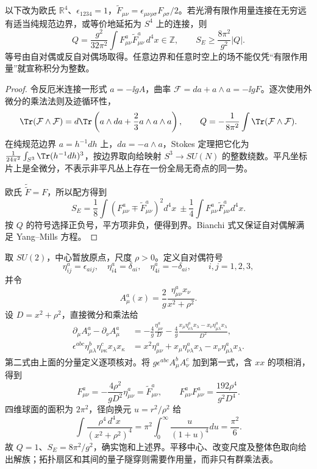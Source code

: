\begin{theorem}[欧氏拓扑荷与自对偶作用量界]
以下改为欧氏 $\mathbb R^4$、$\epsilon_{1234}=1$，$\widetilde F_{\mu\nu}=\epsilon_{\mu\nu\rho\sigma}F_{\rho\sigma}/2$。若光滑有限作用量连接在无穷远有适当纯规范边界，或等价地延拓为 $S^4$ 上的连接，则
\begin{equation}
 Q=\frac{g^2}{32\pi^2}\int F^a_{\mu\nu}\widetilde F^a_{\mu\nu}\,d^4x\in\mathbb Z,
 \qquad S_E\ge\frac{8\pi^2}{g^2}|Q|.
 \label{eq:instanton-charge}
\end{equation}
等号由自对偶或反自对偶场取得。任意边界和任意时空上的场不能仅凭“有限作用量”就宣称积分为整数。
\end{theorem}
\begin{proof}
令反厄米连接一形式 $a=-\ii gA$，曲率 $\mathcal F=da+a\wedge a=-\ii gF$。逐次使用外微分的乘法法则及迹循环性，
\[
 \Tr(\mathcal F\wedge\mathcal F)
 =d\Tr\left(a\wedge da+\frac23a\wedge a\wedge a\right),\qquad
 Q=-\frac1{8\pi^2}\int\Tr(\mathcal F\wedge\mathcal F).
\]
在纯规范边界 $a=h^{-1}dh$ 上，$da=-a\wedge a$，Stokes 定理把它化为 $\tfrac1{24\pi^2}\int_{S^3}\Tr(h^{-1}dh)^3$，按边界取向给映射 $S^3\to SU(N)$ 的整数绕数。平凡坐标片上是全微分，不表示非平凡丛上存在一份全局无奇点的同一势。

欧氏 $\widetilde{\widetilde F}=F$，所以配方得到
\[
 S_E=\frac18\int(F^a_{\mu\nu}\mp\widetilde F^a_{\mu\nu})^2d^4x
 \ \pm\frac14\int F^a_{\mu\nu}\widetilde F^a_{\mu\nu}d^4x.
\]
按 $Q$ 的符号选择正负号，平方项非负，便得到界。Bianchi 式又保证自对偶解满足 Yang--Mills 方程。
\end{proof}

\begin{workedexample}
取 $SU(2)$，中心暂放原点，尺度 $\rho>0$。定义自对偶符号
\[
 \eta^a_{ij}=\epsilon_{aij},\quad \eta^a_{i4}=\delta_{ai},\quad
 \eta^a_{4i}=-\delta_{ai},\qquad i,j=1,2,3,
\]
并令
\begin{equation}
 A_\mu^a(x)=\frac2g\frac{\eta^a_{\mu\nu}x_\nu}{x^2+\rho^2}.
 \label{eq:bpst-instanton}
\end{equation}
设 $D=x^2+\rho^2$，直接微分和乘法给
\begin{align*}
 \partial_\mu A_\nu^a-\partial_\nu A_\mu^a
 &=-\frac4g\frac{\eta^a_{\mu\nu}}D
 -\frac4g\frac{x_\mu\eta^a_{\nu\lambda}x_\lambda-x_\nu\eta^a_{\mu\lambda}x_\lambda}{D^2},\\
 \epsilon^{abc}\eta^b_{\mu\lambda}\eta^c_{\nu\kappa}x_\lambda x_\kappa
 &=x^2\eta^a_{\mu\nu}+x_\mu\eta^a_{\nu\lambda}x_\lambda-x_\nu\eta^a_{\mu\lambda}x_\lambda.
\end{align*}
第二式由上面的分量定义逐项核对。将 $g\epsilon^{abc}A_\mu^bA_\nu^c$ 加到第一式，含 $xx$ 的项相消，得到
\[
 F_{\mu\nu}^a=-\frac{4\rho^2}{gD^2}\eta^a_{\mu\nu}=\widetilde F_{\mu\nu}^a,
 \qquad F^a_{\mu\nu}F^a_{\mu\nu}=\frac{192\rho^4}{g^2D^4}.
\]
四维球面的面积为 $2\pi^2$，径向换元 $u=r^2/\rho^2$ 给
\[
 \int\frac{\rho^4\,d^4x}{(x^2+\rho^2)^4}
 =\pi^2\int_0^\infty\frac{u}{(1+u)^4}du=\frac{\pi^2}{6}.
\]
故 $Q=1$、$S_E=8\pi^2/g^2$，确实饱和上述界。平移中心、改变尺度及整体色取向给出解族；拓扑扇区和其间的量子隧穿则需要作用量，而非只有群乘法表。
\end{workedexample}

